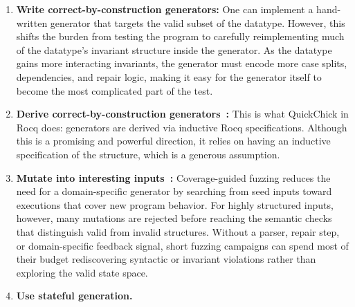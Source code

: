 \begin{enumerate}
  \item \textbf{Write correct-by-construction generators:} One can implement a
        hand-written generator that targets the valid subset of the datatype. However,
        this shifts the burden from testing the program to carefully reimplementing much
        of the datatype's invariant structure inside the generator. As the datatype gains
        more interacting invariants, the generator must encode more case splits,
        dependencies, and repair logic, making it easy for the generator itself to become
        the most complicated part of the test.
  \item \textbf{Derive correct-by-construction generators~\cite{GeneratingGoodGenerators}:} This is what
        QuickChick in Rocq does: generators are derived via inductive Rocq specifications.
        Although this is a promising and powerful direction, it relies on having an inductive
        specification of the structure, which is a generous assumption.
  \item \textbf{Mutate into interesting inputs~\cite{aflplusplus}:} Coverage-guided
        fuzzing reduces the need for a domain-specific generator by searching from seed
        inputs toward executions that cover new program behavior. For highly structured
        inputs, however, many mutations are rejected before reaching the semantic checks
        that distinguish valid from invalid structures. Without a parser, repair step, or
        domain-specific feedback signal, short fuzzing campaigns can spend most of their
        budget rediscovering syntactic or invariant violations rather than exploring the
        valid state space.
  \item \textbf{Use stateful generation.}
\end{enumerate}

